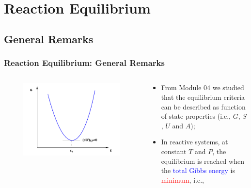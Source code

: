 \documentclass[10pt,compress]{beamer}
\newcommand{\red}{\textcolor{red}}
\newcommand{\blue}{\textcolor{blue}}
\begin{document}
\section{Reaction Equilibrium}
\subsection{General Remarks}

\begin{frame}
  \frametitle{Reaction Equilibrium: General Remarks}
  \begin{columns}
     \begin{column}[l]{0.5\linewidth}\scriptsize
      \begin{figure}%
        \begin{center}
          \includegraphics[width=1.05\columnwidth,clip]{./Pics/ChemicalReactions_GxPlot}
        \end{center}
      \end{figure}
     \end{column}
     \begin{column}[l]{0.5\linewidth}%
        \begin{itemize} 
           \item<1-> From Module 04 we studied that the equilibrium criteria can be described as function of state properties (i.e., $G$, $S$, $U$ and $A$);
           \item<2-> In reactive systems, at constant $T$ and $P$, the equilibrium is reached when the \blue{total Gibbs energy} is \red{minimum}, i.e., 
        \end{itemize}
     \end{column}
  \end{columns}
\end{frame}
\normalsize
\end{document}
